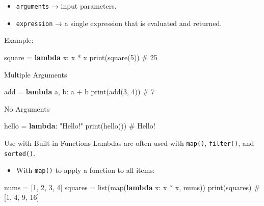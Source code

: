 \documentclass[
  letterpaper,
  DIV=11,
  numbers=noendperiod]{scrreprt}
\newenvironment{Shaded}{\begin{snugshade}}{\end{snugshade}}
\newcommand{\BuiltInTok}[1]{\textcolor[rgb]{0.00,0.23,0.31}{#1}}
\newcommand{\CommentTok}[1]{\textcolor[rgb]{0.37,0.37,0.37}{#1}}
\newcommand{\DecValTok}[1]{\textcolor[rgb]{0.68,0.00,0.00}{#1}}
\newcommand{\KeywordTok}[1]{\textcolor[rgb]{0.00,0.23,0.31}{\textbf{#1}}}
\newcommand{\NormalTok}[1]{\textcolor[rgb]{0.00,0.23,0.31}{#1}}
\newcommand{\OperatorTok}[1]{\textcolor[rgb]{0.37,0.37,0.37}{#1}}
\newcommand{\StringTok}[1]{\textcolor[rgb]{0.13,0.47,0.30}{#1}}
\providecommand{\tightlist}{%
  \setlength{\itemsep}{0pt}\setlength{\parskip}{0pt}}
\begin{document}
\begin{itemize}
\tightlist
\item
  \texttt{arguments} → input parameters.
\item
  \texttt{expression} → a single expression that is evaluated and
  returned.
\end{itemize}

Example:

\begin{Shaded}
\begin{Highlighting}[]
\NormalTok{square }\OperatorTok{=} \KeywordTok{lambda}\NormalTok{ x: x }\OperatorTok{*}\NormalTok{ x}
\BuiltInTok{print}\NormalTok{(square(}\DecValTok{5}\NormalTok{))   }\CommentTok{\# 25}
\end{Highlighting}
\end{Shaded}

Multiple Arguments

\begin{Shaded}
\begin{Highlighting}[]
\NormalTok{add }\OperatorTok{=} \KeywordTok{lambda}\NormalTok{ a, b: a }\OperatorTok{+}\NormalTok{ b}
\BuiltInTok{print}\NormalTok{(add(}\DecValTok{3}\NormalTok{, }\DecValTok{4}\NormalTok{))   }\CommentTok{\# 7}
\end{Highlighting}
\end{Shaded}

No Arguments

\begin{Shaded}
\begin{Highlighting}[]
\NormalTok{hello }\OperatorTok{=} \KeywordTok{lambda}\NormalTok{: }\StringTok{"Hello!"}
\BuiltInTok{print}\NormalTok{(hello())     }\CommentTok{\# Hello!}
\end{Highlighting}
\end{Shaded}

Use with Built-in Functions Lambdas are often used with \texttt{map()},
\texttt{filter()}, and \texttt{sorted()}.

\begin{itemize}
\tightlist
\item
  With \texttt{map()} to apply a function to all items:
\end{itemize}

\begin{Shaded}
\begin{Highlighting}[]
\NormalTok{nums }\OperatorTok{=}\NormalTok{ [}\DecValTok{1}\NormalTok{, }\DecValTok{2}\NormalTok{, }\DecValTok{3}\NormalTok{, }\DecValTok{4}\NormalTok{]}
\NormalTok{squares }\OperatorTok{=} \BuiltInTok{list}\NormalTok{(}\BuiltInTok{map}\NormalTok{(}\KeywordTok{lambda}\NormalTok{ x: x }\OperatorTok{*}\NormalTok{ x, nums))}
\BuiltInTok{print}\NormalTok{(squares)   }\CommentTok{\# [1, 4, 9, 16]}
\end{Highlighting}
\end{Shaded}
\end{document}
